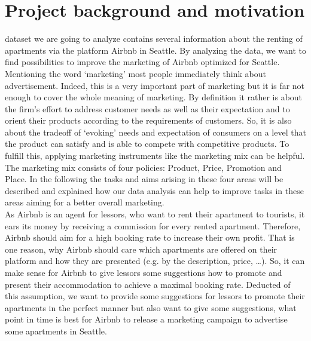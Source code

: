 %
\IEEEpeerreviewmaketitle













\section{Project background and motivation}

 dataset we are going to analyze contains several information about the renting of apartments via the platform Airbnb in Seattle. By analyzing the data, we want to find possibilities to improve the marketing of Airbnb optimized for Seattle. Mentioning the word ‘marketing’ most people immediately think about advertisement. Indeed, this is a very important part of marketing but it is far not enough to cover the whole meaning of marketing. By definition it rather is about the firm’s effort to address customer needs as well as their expectation and to orient their products according to the requirements of customers. So, it is also about the tradeoff of ‘evoking’ needs and expectation of consumers on a level that the product can satisfy and is able to compete with competitive products. To fulfill this, applying marketing instruments like the marketing mix can be helpful. The marketing mix consists of four policies: Product, Price, Promotion and Place. In the following the tasks and aims arising in these four areas will be described and explained how our data analysis can help to improve tasks in these areas aiming for a better overall marketing.\\As Airbnb is an agent for lessors, who want to rent their apartment to tourists, it ears its money by receiving a commission for every rented apartment. Therefore, Airbnb should aim for a high booking rate to increase their own profit. That is one reason, why Airbnb should care which apartments are offered on their platform and how they are presented (e.g. by the description, price, …). So, it can make sense for Airbnb to give lessors some suggestions how to promote and present their accommodation to achieve a maximal booking rate. Deducted of this assumption, we want to provide some suggestions for lessors to promote their apartments in the perfect manner but also want to give some suggestions, what point in time is best for Airbnb to release a marketing campaign to advertise some apartments in Seattle. 
